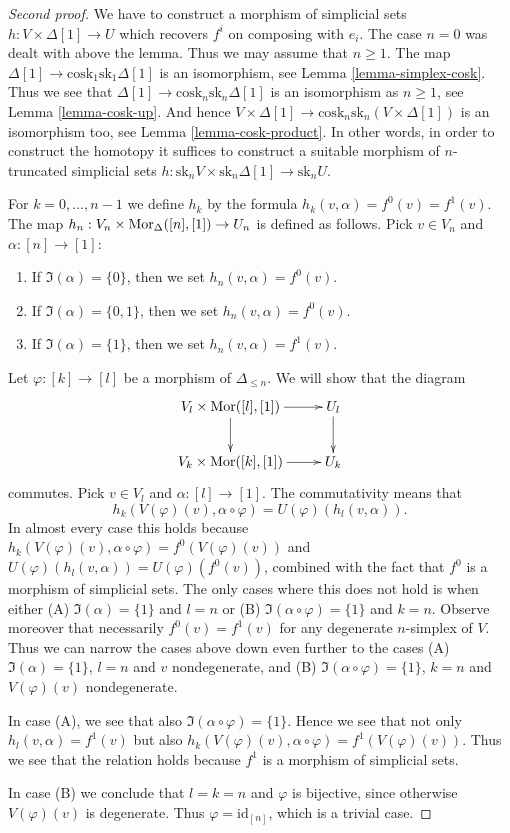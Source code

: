 \begin{proof}[Second proof]
We have to construct a morphism of simplicial sets
$h : V \times \Delta[1] \to U$ which recovers $f^i$ on composing with $e_i$.
The case $n = 0$ was dealt with above the lemma.
Thus we may assume that $n \geq 1$.
The map $\Delta[1] \to \text{cosk}_1 \text{sk}_1 \Delta[1]$
is an isomorphism, see Lemma \ref{lemma-simplex-cosk}.
Thus we see that $\Delta[1] \to \text{cosk}_n \text{sk}_n \Delta[1]$
is an isomorphism as $n \geq 1$, see
Lemma \ref{lemma-cosk-up}. And hence $V \times \Delta[1] \to
\text{cosk}_n \text{sk}_n (V \times \Delta[1])$
is an isomorphism too, see Lemma \ref{lemma-cosk-product}.
In other words, in order to construct the homotopy
it suffices to construct a suitable
morphism of $n$-truncated simplicial sets
$h : \text{sk}_n V \times \text{sk}_n \Delta[1] \to \text{sk}_n U$.

\medskip\noindent
For $k = 0, \ldots, n - 1$ we define $h_k$ by the
formula $h_k(v, \alpha) = f^0(v) = f^1(v)$.
The map $h_n : V_n \times \mathop{\mathrm{Mor}}\nolimits_{\Delta}([n], [1]) \to U_n$
is defined as follows. Pick $v \in V_n$ and $\alpha : [n] \to [1]$:
\begin{enumerate}
\item If $\Im(\alpha) = \{0\}$, then we set $h_n(v, \alpha) = f^0(v)$.
\item If $\Im(\alpha) = \{0, 1\}$, then we set $h_n(v, \alpha) = f^0(v)$.
\item If $\Im(\alpha) = \{1\}$, then we set $h_n(v, \alpha) = f^1(v)$.
\end{enumerate}
Let $\varphi : [k] \to [l]$ be a morphism of $\Delta_{\leq n}$.
We will show that the diagram
$$
\xymatrix{
V_{l} \times \Mor([l], [1]) \ar[r] \ar[d] & U_{l} \ar[d] \\
V_{k} \times \Mor([k], [1]) \ar[r] & U_{k}
}
$$
commutes.
Pick $v \in V_{l}$ and $\alpha : [l] \to [1]$.
The commutativity means that
$$
h_k(V(\varphi)(v), \alpha \circ \varphi)
=
U(\varphi)(h_l(v, \alpha)).
$$
In almost every case this holds because
$h_k(V(\varphi)(v), \alpha \circ \varphi) = f^0(V(\varphi)(v))$
and $U(\varphi)(h_l(v, \alpha)) = U(\varphi)(f^0(v))$, combined
with the fact that $f^0$ is a morphism of simplicial sets.
The only cases where this does not hold is when
either (A) $\Im(\alpha) = \{1\}$ and $l = n$
or (B) $\Im(\alpha \circ \varphi) = \{1\}$ and $k = n$.
Observe moreover that necessarily $f^0(v) = f^1(v)$
for any degenerate $n$-simplex of $V$.
Thus we can narrow the cases above down even further
to the cases (A) $\Im(\alpha) = \{1\}$, $l = n$
and $v$ nondegenerate, and (B)
$\Im(\alpha \circ \varphi) = \{1\}$, $k = n$
and $V(\varphi)(v)$ nondegenerate.

\medskip\noindent
In case (A), we see that also $\Im(\alpha \circ \varphi) = \{1\}$.
Hence we see that not only $h_l(v, \alpha) = f^1(v)$ but also
$h_k(V(\varphi)(v), \alpha \circ \varphi) = f^1(V(\varphi)(v))$.
Thus we see that the relation holds because $f^1$ is a morphism
of simplicial sets.

\medskip\noindent
In case (B) we conclude that $l = k = n$ and
$\varphi$ is bijective, since otherwise $V(\varphi)(v)$
is degenerate. Thus $\varphi = \text{id}_{[n]}$, which is a trivial case.
\end{proof}

